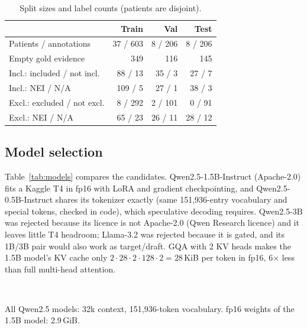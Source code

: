 \documentclass[conference]{IEEEtran}
\begin{document}
\begin{table}[t]
\centering
\caption{Split sizes and label counts (patients are disjoint).}
\label{tab:data}
\footnotesize
\begin{tabular}{lrrr}
\toprule
 & Train & Val & Test \\
\midrule
Patients / annotations & 37 / 603 & 8 / 206 & 8 / 206 \\
Empty gold evidence & 349 & 116 & 145 \\
\midrule
Incl.: included / not incl. & 88 / 13 & 35 / 3 & 27 / 7 \\
Incl.: NEI / N/A & 109 / 5 & 27 / 1 & 38 / 3 \\
Excl.: excluded / not excl. & 8 / 292 & 2 / 101 & 0 / 91 \\
Excl.: NEI / N/A & 65 / 23 & 26 / 11 & 28 / 12 \\
\bottomrule
\end{tabular}
\end{table}

\subsection{Model selection}
Table~\ref{tab:models} compares the candidates. Qwen2.5-1.5B-Instruct (Apache-2.0) fits a Kaggle T4 in fp16 with LoRA and gradient checkpointing, and Qwen2.5-0.5B-Instruct shares its tokenizer exactly (same 151,936-entry vocabulary and special tokens, checked in code), which speculative decoding requires. Qwen2.5-3B was rejected because its licence is not Apache-2.0 (Qwen Research licence) and it leaves little T4 headroom; Llama-3.2 was rejected because it is gated, and its 1B/3B pair would also work as target/draft. GQA with 2 KV heads makes the 1.5B model's KV cache only $2\cdot28\cdot2\cdot128\cdot2 = 28$\,KiB per token in fp16, 6$\times$ less than full multi-head attention.

\begin{table}[t]
\centering
\caption{Decoder candidates (from model cards and configs).}
\label{tab:models}
\footnotesize
\setlength{\tabcolsep}{3pt}
\\[2pt]
\raggedright\scriptsize All Qwen2.5 models: 32k context, 151,936-token vocabulary. fp16 weights of the 1.5B model: 2.9\,GiB.
\end{table}
\end{document}

